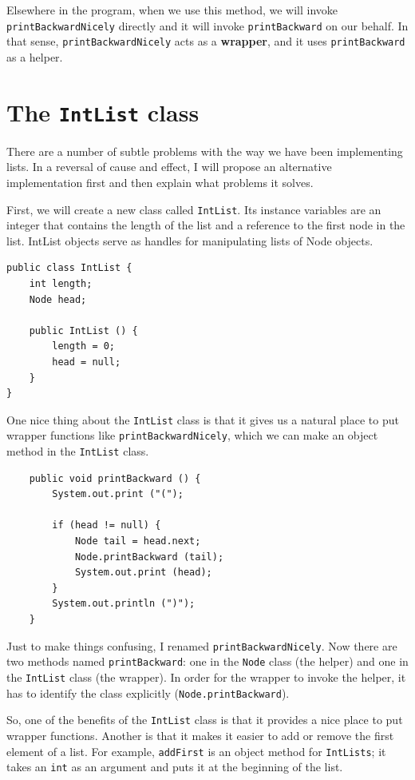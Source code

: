 \documentclass[12pt]{book}
\theoremstyle{exercise}
\begin{document}

Elsewhere in the program, when we use this method, we will
invoke {\tt printBackwardNicely} directly and it will invoke
{\tt printBackward} on our behalf.  In that sense, 
{\tt printBackwardNicely} acts as a {\bf wrapper}, and it uses
{\tt printBackward} as a helper.


\section {The {\tt IntList} class}

There are a number of subtle problems with the way we have been
implementing lists.  In a reversal of cause and effect, I will
propose an alternative implementation first and then explain what
problems it solves.

First, we will create a new class called {\tt IntList}.  Its
instance variables are an integer that contains the length of the list
and a reference to the first node in the list.  IntList objects
serve as handles for manipulating lists of Node objects.

\begin{verbatim}
public class IntList {
    int length;
    Node head;

    public IntList () {
        length = 0;
        head = null;
    }
}
\end{verbatim}
%
One nice thing about the {\tt IntList} class is that it gives
us a natural place to put wrapper functions like
{\tt printBackwardNicely}, which we can make an object
method in the {\tt IntList} class.

\begin{verbatim}
    public void printBackward () {
        System.out.print ("(");

        if (head != null) {
            Node tail = head.next;
            Node.printBackward (tail);
            System.out.print (head);
        }
        System.out.println (")");
    }	
\end{verbatim}
%
Just to make things confusing, I renamed {\tt printBackwardNicely}.
Now there are two methods named {\tt printBackward}: one in the
{\tt Node} class (the helper) and one in the {\tt IntList} class
(the wrapper).  In order for the wrapper to invoke the helper, it has
to identify the class explicitly ({\tt Node.printBackward}).

So, one of the benefits of the {\tt IntList} class is that
it provides a nice place to put wrapper functions.
Another is that it makes it easier to add or remove
the first element of a list.  For example, {\tt addFirst}
is an object method for {\tt IntLists}; it
takes an {\tt int} as an argument and puts it at the beginning of
the list.
\end{document}
